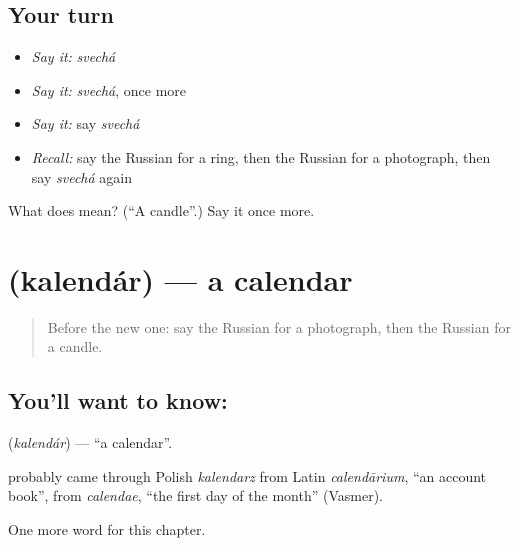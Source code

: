 \subsection*{Your turn}
\begin{itemize}
\raggedright
  \item \emph{Say it:} \emph{svechá}
  \item \emph{Say it:} \emph{svechá}, once more
  \item \emph{Say it:} say \emph{svechá}
  \item \emph{Recall:} say the Russian for a ring, then the Russian for a photograph, then say \emph{svechá} again
\end{itemize}

\begin{tcolorbox}[breakable,colback=teal!4,colframe=teal!35!black,title={Before you move on}]
What does  mean? (\textquotedblleft{}A candle\textquotedblright{}.) Say it once more.
\end{tcolorbox}
\section[\texorpdfstring{\ru{календарь} (kalendár)}{календарь (kalendár)}]{ (kalendár) — a calendar}

\label{lesson:RU-C100-calendar}



\begin{quote}
Before the new one: say the Russian for a photograph, then the Russian for a candle.
\end{quote}

\subsection*{You'll want to know: }
\textbf{} (\emph{kalendár}) — \textquotedblleft{}a calendar\textquotedblright{}.

\begin{cousinweb}
\textbf{} probably came through Polish \emph{kalendarz} from Latin \emph{calendārium}, \textquotedblleft{}an account book\textquotedblright{}, from \emph{calendae}, \textquotedblleft{}the first day of the month\textquotedblright{} (Vasmer).
\end{cousinweb}

\begin{grammarlens}[title={What you've built}]
One more word for this chapter.
\end{grammarlens}

